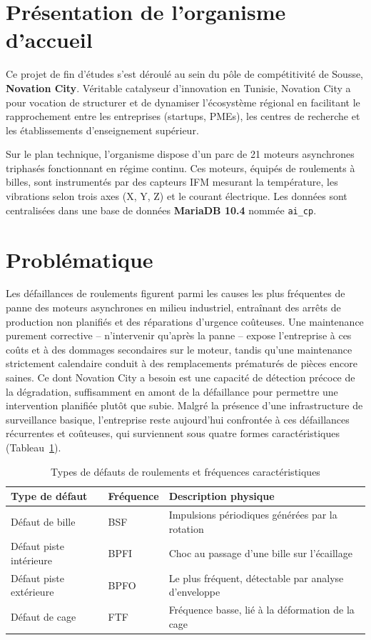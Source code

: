 \documentclass[12pt,a4paper]{report}
\begin{document}
\section{Présentation de l'organisme d'accueil}

Ce projet de fin d'études s'est déroulé au sein du pôle de compétitivité de Sousse,
\textbf{Novation City}. Véritable catalyseur d'innovation en Tunisie, Novation City a pour
vocation de structurer et de dynamiser l'écosystème régional en facilitant le rapprochement entre les entreprises (startups, PMEs), les centres de recherche et les établissements d'enseignement supérieur.

Sur le plan technique, l'organisme dispose d'un parc de 21 moteurs asynchrones
triphasés fonctionnant en régime continu. Ces moteurs, équipés de roulements à billes,
sont instrumentés par des capteurs IFM mesurant la température, les vibrations selon
trois axes (X, Y, Z) et le courant électrique. Les données sont centralisées dans une
base de données \textbf{MariaDB 10.4} nommée \texttt{ai\_cp}.

\section{Problématique}

Les défaillances de roulements figurent parmi les causes les plus fréquentes de panne
des moteurs asynchrones en milieu industriel, entraînant des arrêts de production non
planifiés et des réparations d'urgence coûteuses. Une maintenance purement corrective
-- n'intervenir qu'après la panne -- expose l'entreprise à ces coûts et à des dommages
secondaires sur le moteur, tandis qu'une maintenance strictement calendaire conduit à
des remplacements prématurés de pièces encore saines. Ce dont Novation City a besoin
est une capacité de détection précoce de la dégradation, suffisamment en amont de la
défaillance pour permettre une intervention planifiée plutôt que subie. Malgré la
présence d'une infrastructure de surveillance basique, l'entreprise reste aujourd'hui
confrontée à ces défaillances récurrentes et coûteuses, qui surviennent sous quatre
formes caractéristiques (Tableau~\ref{tab:defauts_roulements}).

\begin{table}[H]
\centering
\caption{Types de défauts de roulements et fréquences caractéristiques}
\label{tab:defauts_roulements}
\begin{tabular}{lll}
\toprule
\textbf{Type de défaut} & \textbf{Fréquence} & \textbf{Description physique} \\
\midrule
Défaut de bille        & BSF  & Impulsions périodiques générées par la rotation \\
Défaut piste intérieure & BPFI & Choc au passage d'une bille sur l'écaillage \\
Défaut piste extérieure & BPFO & Le plus fréquent, détectable par analyse d'enveloppe \\
Défaut de cage         & FTF  & Fréquence basse, lié à la déformation de la cage \\
\bottomrule
\end{tabular}
\end{table}
\end{document}

